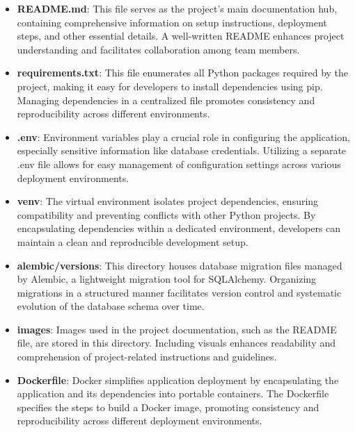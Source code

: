 \begin{itemize}
    \item \textbf{README.md}: This file serves as the project's main documentation hub, containing comprehensive information on setup instructions, deployment steps, and other essential details. A well-written README enhances project understanding and facilitates collaboration among team members.

    \item \textbf{requirements.txt}: This file enumerates all Python packages required by the project, making it easy for developers to install dependencies using pip. Managing dependencies in a centralized file promotes consistency and reproducibility across different environments.

    \item \textbf{.env}: Environment variables play a crucial role in configuring the application, especially sensitive information like database credentials. Utilizing a separate .env file allows for easy management of configuration settings across various deployment environments.

    \item \textbf{venv}: The virtual environment isolates project dependencies, ensuring compatibility and preventing conflicts with other Python projects. By encapsulating dependencies within a dedicated environment, developers can maintain a clean and reproducible development setup.

    \item \textbf{alembic/versions}: This directory houses database migration files managed by Alembic, a lightweight migration tool for SQLAlchemy. Organizing migrations in a structured manner facilitates version control and systematic evolution of the database schema over time.

    \item \textbf{images}: Images used in the project documentation, such as the README file, are stored in this directory. Including visuals enhances readability and comprehension of project-related instructions and guidelines.

    \item \textbf{Dockerfile}: Docker simplifies application deployment by encapsulating the application and its dependencies into portable containers. The Dockerfile specifies the steps to build a Docker image, promoting consistency and reproducibility across different deployment environments.
\end{itemize}

